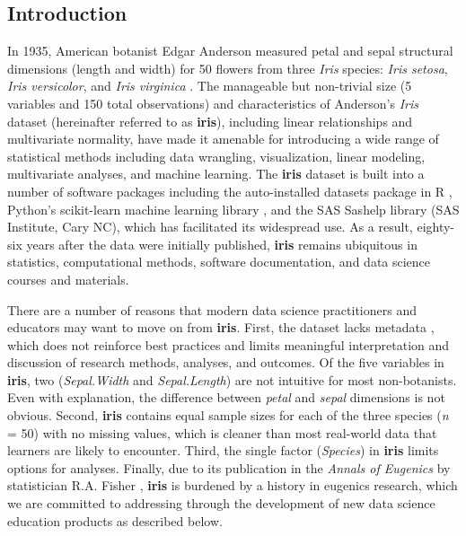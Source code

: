 \hypertarget{introduction}{%
\subsection{Introduction}\label{introduction}}

In 1935, American botanist Edgar Anderson measured petal and sepal
structural dimensions (length and width) for 50 flowers from three
\emph{Iris} species: \emph{Iris setosa}, \emph{Iris versicolor}, and
\emph{Iris virginica} \citep{anderson_irises_1935}. The manageable but
non-trivial size (5 variables and 150 total observations) and
characteristics of Anderson's \emph{Iris} dataset (hereinafter referred
to as \textbf{iris}), including linear relationships and multivariate
normality, have made it amenable for introducing a wide range of
statistical methods including data wrangling, visualization, linear
modeling, multivariate analyses, and machine learning. The \textbf{iris}
dataset is built into a number of software packages including the
auto-installed datasets package in R \citep{r_core_team_r_2019},
Python's scikit-learn machine learning library
\citep{pedregosa_scikit-learn_2011}, and the SAS Sashelp library (SAS
Institute, Cary NC), which has facilitated its widespread use. As a
result, eighty-six years after the data were initially published,
\textbf{iris} remains ubiquitous in statistics, computational methods,
software documentation, and data science courses and materials.

There are a number of reasons that modern data science practitioners and
educators may want to move on from \textbf{iris}. First, the dataset
lacks metadata \citep{anderson_irises_1935}, which does not reinforce
best practices and limits meaningful interpretation and discussion of
research methods, analyses, and outcomes. Of the five variables in
\textbf{iris}, two (\emph{Sepal.Width} and \emph{Sepal.Length}) are not
intuitive for most non-botanists. Even with explanation, the difference
between \emph{petal} and \emph{sepal} dimensions is not obvious. Second,
\textbf{iris} contains equal sample sizes for each of the three species
(\emph{n} = 50) with no missing values, which is cleaner than most
real-world data that learners are likely to encounter. Third, the single
factor (\emph{Species}) in \textbf{iris} limits options for analyses.
Finally, due to its publication in the \emph{Annals of Eugenics} by
statistician R.A. Fisher \citep{fisher_use_1936}, \textbf{iris} is
burdened by a history in eugenics research, which we are committed to
addressing through the development of new data science education
products as described below.

